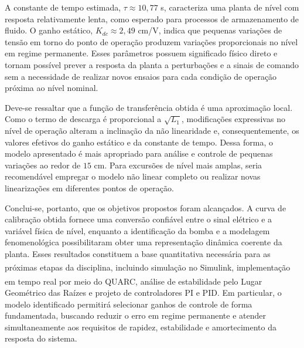 \documentclass[a4paper,12pt]{article}
\begin{document}
\begin{justify}
    \hspace{4ex}A constante de tempo estimada, $\tau \approx 10{,}77$ s, caracteriza uma planta de nível com resposta relativamente lenta, como esperado para processos de armazenamento de fluido. O ganho estático, $K_{dc}\approx2{,}49$ cm/V, indica que pequenas variações de tensão em torno do ponto de operação produzem variações proporcionais no nível em regime permanente. Esses parâmetros possuem significado físico direto e tornam possível prever a resposta da planta a perturbações e a sinais de comando sem a necessidade de realizar novos ensaios para cada condição de operação próxima ao nível nominal.
\end{justify}

\begin{justify}
    \hspace{4ex}Deve-se ressaltar que a função de transferência obtida é uma aproximação local. Como o termo de descarga é proporcional a $\sqrt{L_1}$, modificações expressivas no nível de operação alteram a inclinação da não linearidade e, consequentemente, os valores efetivos do ganho estático e da constante de tempo. Dessa forma, o modelo apresentado é mais apropriado para análise e controle de pequenas variações ao redor de $15$ cm. Para excursões de nível mais amplas, seria recomendável empregar o modelo não linear completo ou realizar novas linearizações em diferentes pontos de operação.
\end{justify}

\begin{justify}
    \hspace{4ex}Conclui-se, portanto, que os objetivos propostos foram alcançados. A curva de calibração obtida fornece uma conversão confiável entre o sinal elétrico e a variável física de nível, enquanto a identificação da bomba e a modelagem fenomenológica possibilitaram obter uma representação dinâmica coerente da planta. Esses resultados constituem a base quantitativa necessária para as próximas etapas da disciplina, incluindo simulação no Simulink\textsuperscript{\textregistered}, implementação em tempo real por meio do QUARC\textsuperscript{\textregistered}, análise de estabilidade pelo Lugar Geométrico das Raízes e projeto de controladores PI e PID. Em particular, o modelo identificado permitirá selecionar ganhos de controle de forma fundamentada, buscando reduzir o erro em regime permanente e atender simultaneamente aos requisitos de rapidez, estabilidade e amortecimento da resposta do sistema.
\end{justify}

\newpage


{}
{}

\nocite{*}



\newpage
\appendix


\end{document}

